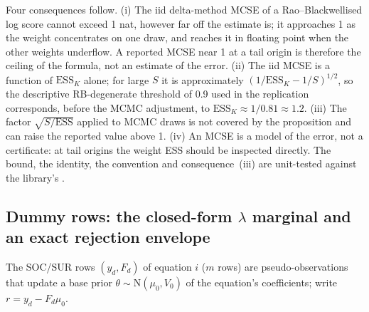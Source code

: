 Four consequences follow.
(i) The iid delta-method MCSE of a Rao--Blackwellised log score cannot exceed 1 nat, however far
off the estimate is; it approaches 1 as the weight concentrates on one draw, and reaches it in
floating point when the other weights underflow.
A reported MCSE near 1 at a tail origin is therefore the ceiling of the formula, not an estimate of
the error.
(ii) The iid MCSE is a function of $\mathrm{ESS}_K$ alone; for large $S$ it is approximately
$(1/\mathrm{ESS}_K - 1/S)^{1/2}$, so the descriptive RB-degenerate threshold of 0.9 used in the
replication corresponds, before the MCMC adjustment, to $\mathrm{ESS}_K \approx 1/0.81 \approx 1.2$.
(iii) The factor $\sqrt{S/\mathrm{ESS}}$ applied to MCMC draws is not covered by the proposition and
can raise the reported value above 1.
(iv) An MCSE is a model of the error, not a certificate: at tail origins the weight ESS should be
inspected directly.
The bound, the identity, the  convention and consequence~(iii) are unit-tested
against the library's .

\subsection{Dummy rows: the closed-form \texorpdfstring{$\lambda$}{lambda} marginal and an exact rejection
envelope}\label{app:dummies}

The SOC/SUR rows $(y_d, F_d)$ of equation $i$ ($m$ rows) are pseudo-observations that update a base
prior $\theta \sim \mathrm{N}(\mu_0, V_0)$ of the equation's coefficients; write $r = y_d -
F_d\mu_0$.

